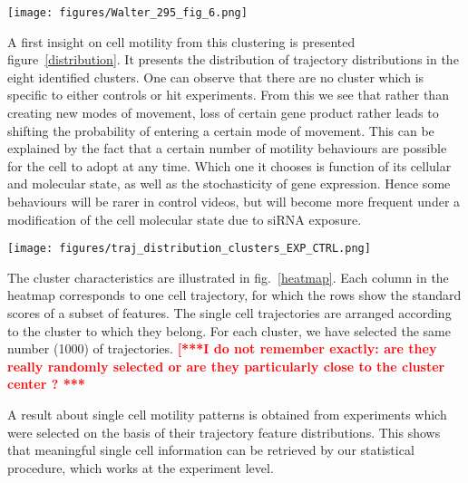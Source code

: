 \begin{figure*}[!ht]
\centerline{\texttt{[image: figures/Walter\_295\_fig\_6.png]}}
\caption{Evaluation of k-means clustering quality as a function of the number of clusters (average and standard deviation on 10 algorithm initializations). The same protocol was applied to a subset of the Mitocheck dataset, and two samples of the same dimensions, respectively drawn from the Uniform and the Normal distributions. }
\label{clusterscore}
\end{figure*}

A first insight on cell motility from this clustering is presented
figure~\ref{distribution}. It presents the distribution of trajectory
distributions in the eight identified clusters. One can observe that
there are no cluster which is specific to either controls or
hit experiments. From this we see that rather than creating new
modes of movement, loss of  certain gene product rather leads to shifting the
probability of entering a certain mode of movement. 
This can be
explained by the fact that a certain number of motility behaviours are
possible for the cell to adopt at any time. Which one it chooses is
function of its cellular and molecular state, as well as the
stochasticity of gene expression. Hence some behaviours will be rarer
in control videos, but will become more
frequent under a modification of the cell molecular state due to siRNA
exposure. 

\begin{figure*}[!ht]
\centering
\texttt{[image: figures/traj\_distribution\_clusters\_EXP\_CTRL.png]}
\caption{Comparison of cluster distributions between controls (Ctrl) and experiments (Exp) for the eight trajectory clusters which were identified in the Mitocheck dataset. The clusters are in the same order as in figure ~\ref{heatmap}.}
\label{distribution}
\end{figure*}
 
The cluster characteristics are illustrated in fig.~\ref{heatmap}. Each
column in the heatmap corresponds to one cell trajectory, for which
the rows show the standard scores of a subset of features. The single
cell trajectories are arranged according to the cluster to which they
belong. For each cluster, we have selected the same number (1000) of
trajectories.  \textcolor{red}{\bf [***I
  do not remember exactly: are they really randomly selected or are
  they particularly close to the cluster center ? ***}

A result about single cell motility patterns is obtained from
experiments which were selected on the basis of their trajectory
feature distributions. This shows that meaningful single cell
information can be retrieved by our statistical procedure, which works
at the experiment level. 

